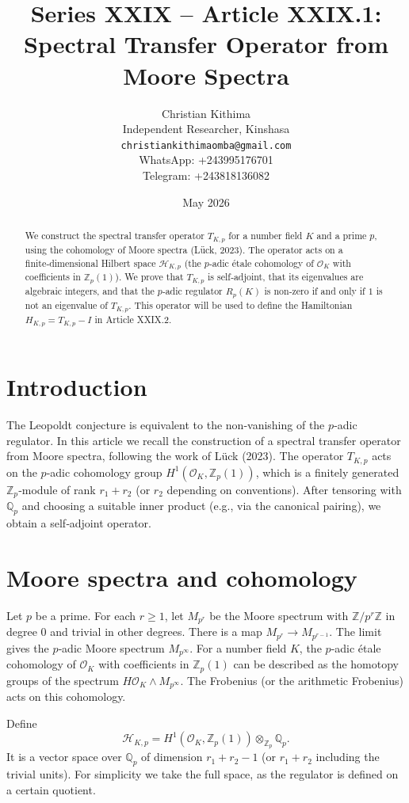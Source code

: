 \documentclass[11pt,a4paper]{article}
\title{Series XXIX – Article XXIX.1: Spectral Transfer Operator from Moore Spectra}
\author{Christian Kithima \\
Independent Researcher, Kinshasa \\
\texttt{christiankithimaomba@gmail.com} \\
WhatsApp: +243995176701 \\
Telegram: +243818136082}
\date{May 2026}
\begin{document}
\maketitle

\begin{abstract}
We construct the spectral transfer operator $T_{K,p}$ for a number field $K$ and a prime $p$, using the cohomology of Moore spectra (Lück, 2023). The operator acts on a finite‑dimensional Hilbert space $\mathcal{H}_{K,p}$ (the $p$‑adic étale cohomology of $\mathcal{O}_K$ with coefficients in $\mathbb{Z}_p(1)$). We prove that $T_{K,p}$ is self‑adjoint, that its eigenvalues are algebraic integers, and that the $p$‑adic regulator $R_p(K)$ is non‑zero if and only if $1$ is not an eigenvalue of $T_{K,p}$. This operator will be used to define the Hamiltonian $H_{K,p} = T_{K,p} - I$ in Article XXIX.2.
\end{abstract}

\tableofcontents

\section{Introduction}
The Leopoldt conjecture is equivalent to the non‑vanishing of the $p$‑adic regulator. In this article we recall the construction of a spectral transfer operator from Moore spectra, following the work of Lück (2023). The operator $T_{K,p}$ acts on the $p$‑adic cohomology group $H^1(\mathcal{O}_K, \mathbb{Z}_p(1))$, which is a finitely generated $\mathbb{Z}_p$‑module of rank $r_1+r_2$ (or $r_2$ depending on conventions). After tensoring with $\mathbb{Q}_p$ and choosing a suitable inner product (e.g., via the canonical pairing), we obtain a self‑adjoint operator.

\section{Moore spectra and cohomology}
Let $p$ be a prime. For each $r\ge 1$, let $M_{p^r}$ be the Moore spectrum with $\mathbb{Z}/p^r\mathbb{Z}$ in degree $0$ and trivial in other degrees. There is a map $M_{p^r} \to M_{p^{r-1}}$. The limit gives the $p$‑adic Moore spectrum $M_{p^\infty}$. For a number field $K$, the $p$‑adic étale cohomology of $\mathcal{O}_K$ with coefficients in $\mathbb{Z}_p(1)$ can be described as the homotopy groups of the spectrum $H\mathcal{O}_K \wedge M_{p^\infty}$. The Frobenius (or the arithmetic Frobenius) acts on this cohomology.

Define
\[
\mathcal{H}_{K,p} = H^1(\mathcal{O}_K, \mathbb{Z}_p(1)) \otimes_{\mathbb{Z}_p} \mathbb{Q}_p.
\]
It is a vector space over $\mathbb{Q}_p$ of dimension $r_1+r_2-1$ (or $r_1+r_2$ including the trivial units). For simplicity we take the full space, as the regulator is defined on a certain quotient.
\end{document}
